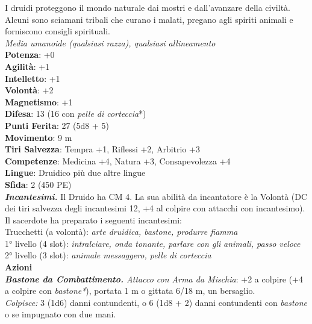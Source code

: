 \begin{multicols}{2}
I druidi proteggono il mondo naturale dai mostri e dall'avanzare della civiltà. Alcuni sono sciamani tribali che curano i malati, pregano agli spiriti animali e forniscono consigli spirituali.\\
\emph{Media umanoide (qualsiasi razza), qualsiasi allineamento}\\
\textbf{Potenza}: +0\\
\textbf{Agilità}: +1\\
\textbf{Intelletto}: +1\\
\textbf{Volontà}: +2\\
\textbf{Magnetismo}: +1\\
\textbf{Difesa}: 13 (16 con \emph{pelle di corteccia}*)\\
\textbf{Punti Ferita}: 27 (5d8 + 5)\\
\textbf{Movimento}: 9 m\\
\textbf{Tiri Salvezza}: Tempra +1, Riflessi +2, Arbitrio +3 \\
\textbf{Competenze}: Medicina +4, Natura +3, Consapevolezza +4\\
\textbf{Lingue}: Druidico più due altre lingue\\
\textbf{Sfida}: 2 (450 PE)\smallskip\\
\emph{\textbf{Incantesimi.}} Il Druido ha CM 4. La sua abilità da incantatore è la Volontà (DC dei tiri salvezza degli incantesimi 12, +4 al colpire con attacchi con incantesimo). Il sacerdote ha preparato i seguenti incantesimi:\\
Trucchetti (a volontà): \emph{arte druidica, bastone, produrre fiamma}\\
1° livello (4 slot): \emph{intralciare, onda tonante, parlare con gli} \emph{animali, passo veloce}\\
2° livello (3 slot): \emph{animale messaggero, pelle di corteccia}\\
\smallskip\textbf{Azioni}\\
\emph{\textbf{Bastone da Combattimento.} Attacco con Arma da Mischia}: +2 a colpire (+4 a colpire con \emph{bastone*}), portata 1 m o gittata 6/18 m, un bersaglio. \\
\emph{Colpisce:} 3 (1d6) danni contundenti, o 6 (1d8 + 2) danni contundenti con \emph{bastone} o se impugnato con due mani.\\


\end{multicols}

